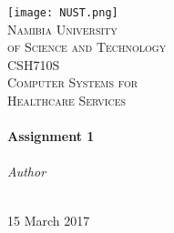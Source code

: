 \begin{titlepage}
  \begin{center}


    \vspace*{0.5 cm}
    \texttt{[image: NUST.png]}\\[0.5 cm]
    \textsc{\LARGE Namibia University}\\[0.4 cm]
    \textsc{\LARGE of Science and Technology}\\[2.0 cm]
	\textsc{\Large CSH710S}\\[0.5 cm]
    \textsc{\Large Computer Systems for }\\[0.3 cm]
	\textsc{\Large Healthcare Services}\\[0.5cm]

    \HRule\\[0.4cm]
		{\huge \bfseries Assignment 1 \\[0.4cm]}
    \HRule\\[1.5cm]

    \emph{Author}\\[0.1cm]
    \noindent{}\\[1cm]

    \vfill

    {\large 15 March 2017}

  \end{center}
\end{titlepage}
